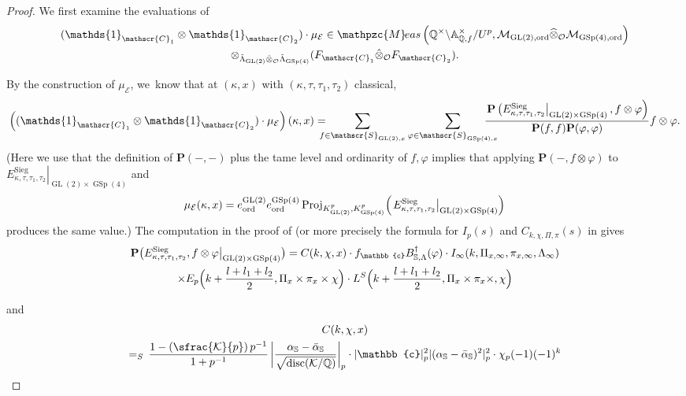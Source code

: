 \documentclass[JEP,XML,SOM,Unicode,published]{cedram}
\newcommand{\NoChangel}[1]{%
\expandafter\let\csname old\string#1\endcsname=#1
\let#1=\relax
\newcommand{#1}{\mathop{\mathcode`l="716C\csname old\string#1\endcsname\mathcode`l="7160}\displaylimits}%
}
\theoremstyle{plain}
\theoremstyle{remark}
\let\mr\mathrm
\newcommand{\bA}{\mathbb{A}}
\newcommand{\bQ}{\mathbb{Q}}
\newcommand{\bS}{\mathbb{S}}
\newcommand{\bbc}{\mathbb{c}}
\newcommand{\cE}{\mathcal{E}}
\newcommand{\cK}{\mathcal{K}}
\newcommand{\cM}{\mathcal{M}}
\newcommand{\cO}{\mathcal{O}}
\newcommand{\sC}{\mathscr{C}}
\newcommand{\sS}{\mathscr{S}}
\newcommand{\bfP}{\mathbf{P}}
\DeclareMathOperator{\GL}{GL}
\DeclareMathOperator{\GSp}{GSp}
\newcommand{\Meas}{\mathpzc{M}\mkern-2mu eas}
\newcommand{\ord}{\mathrm{ord}}
\newcommand{\vol}{\mathrm{vol}}\NoChangel{\vol}
\newcommand{\Sieg}{\mr{Sieg}}
\newcommand{\disc}{\mathrm{disc}}
\let\wh\widehat
\let\bes B
\newcommand{\alphaS}{\alpha_{\mathbb{S}}}
\newcommand{\alphabS}{\bar{\alpha}_{\mathbb{S}}}
\begin{document}
\begin{proof}
We first examine the evaluations of
\begin{multline*}
(\mathds{1}_{\sC_1}\otimes \mathds{1}_{\sC_2})\cdot \mu_{\cE} \in \Meas\left(\bQ^\times\backslash\bA^\times_{\bQ,f}/U^p,\cM_{\GL(2),\ord}\wh{\otimes}_{\cO} \cM_{\GSp(4),\ord}\right)\\
\otimes_{\tilde{\Lambda}_{\GL(2)}\hat{\otimes}_\cO\tilde{\Lambda}_{\GSp(4)}} (F_{\sC_1}\hat{\otimes}_\cO F_{\sC_2}).
\end{multline*}

By the construction of $\mu_\cE$, we~know that at $(\kappa,x)$ with $(\kappa,\tau,\tau_1,\tau_2)$ classical,
\[
\left((\mathds{1}_{\sC_1}\otimes \mathds{1}_{\sC_2})\cdot \mu_{\cE}\right)(\kappa,x)
=\hspace*{-3mm}\sum_{f\in \sS_{\GL(2),x}}\sum_{\varphi\in \sS_{\GSp(4),x}}\hspace*{-5mm}
\frac{\left.\bfP\left(E^\Sieg_{\kappa,\tau,\tau_1,\tau_2}\right|_{\GL(2)\times\GSp(4)},f\otimes\varphi\right)}{\bfP(f,f)\bfP(\varphi,\varphi)}
f\otimes\varphi.
\]
(Here we use that the definition of $\bfP(-,-)$ plus the tame level and ordinarity of $f,\varphi$ implies that applying $\bfP(-,f\otimes \varphi)$ to $\left.E^\Sieg_{\kappa,\tau,\tau_1,\tau_2}\right|_{\GL(2)\times\GSp(4)}$ and
\[
\mu_\cE(\kappa,x)=e^{\GL(2)}_\ord e^{\GSp(4)}_\ord \,{\rm Proj}_{K^p_{\GL(2)},K^p_{\GSp(4)}}\Bigl(\left.E^\Sieg_{\kappa,\tau,\tau_1,\tau_2}\right|_{\GL(2)\times\GSp(4)}\Bigr)
\]
produces the same value.) The computation in the proof of \cite[Th.\,4.2.1]{pFL} (or more precisely the formula for $I_p(s)$ and $C_{k,\chi,\Pi,\pi}(s)$ in \loccit gives
\begin{multline*}
\bfP\bigl(E^\Sieg_{\kappa,\tau,\tau_1,\tau_2},f\otimes\varphi\big|_{\GL(2)\times\GSp(4)}\bigr)
=C(k,\chi,x)\cdot f_\bbc \bes^\dagger_{\bS,\Lambda}(\varphi)
\cdot I_\infty(k,\Pi_{x,\infty},\pi_{x,\infty},\Lambda_\infty)\\
\times E_p\Bigl(k+\frac{l+l_1+l_2}{2},\Pi_x\times\pi_x\times \chi\Bigr)\cdot L^S\Bigl(k+\frac{l+l_1+l_2}{2},\Pi_x\times\pi_x\times, \chi\Bigr)
\end{multline*}
\begin{minipage}{\textwidth}
and
\begin{multline}\label{eq:factor-C}
C(k,\chi,x)\\
=\vol_S \, \frac{1-\left(\sfrac{\cK}{p}\right)p^{-1}}{1+p^{-1}}\,\biggl|\frac{\alphaS-\alphabS}{\sqrt{\disc(\cK/\bQ)}}\biggr|_p\cdot |\bbc|^2_p |(\alphaS-\alphabS)^2|^2_p\cdot \chi_p(-1)(-1)^k\\

\end{multline}
\end{minipage}
\end{proof}
\end{document}
